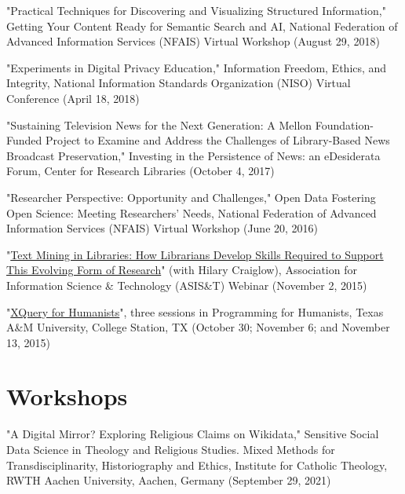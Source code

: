 \documentclass[]{res} %
\begin{document}
\begin{resume}
\begin{hangparas}{.25in}{1}"Practical Techniques for Discovering and Visualizing Structured Information," Getting Your Content Ready for Semantic Search and AI, National Federation of Advanced Information Services (NFAIS) Virtual Workshop (August 29, 2018)\end{hangparas}

\begin{hangparas}{.25in}{1}"Experiments in Digital Privacy Education," Information Freedom, Ethics, and Integrity, National Information Standards Organization (NISO) Virtual Conference (April 18, 2018)\end{hangparas}

\begin{hangparas}{.25in}{1}"Sustaining Television News for the Next Generation: A Mellon Foundation-Funded Project to Examine and Address the Challenges of Library-Based News Broadcast Preservation," Investing in the Persistence of News: an eDesiderata Forum, Center for Research Libraries (October 4, 2017)\end{hangparas}

\begin{hangparas}{.25in}{1}"Researcher Perspective: Opportunity and Challenges," Open Data Fostering Open Science: Meeting Researchers’ Needs, National Federation of Advanced Information Services (NFAIS) Virtual Workshop (June 20, 2016)\end{hangparas}

\begin{hangparas}{.25in}{1}"\href{https://www.asist.org/events/webinars/text-mining-in-libraries/}{Text Mining in Libraries: How Librarians Develop Skills Required to Support This Evolving Form of Research}" (with Hilary Craiglow), Association for Information Science \& Technology (ASIS\&T) Webinar (November 2, 2015)\end{hangparas}

\begin{hangparas}{.25in}{1}"\href{http://programming4humanists.tamu.edu/syllabus-fall-2015/}{XQuery for Humanists}", three sessions in Programming for Humanists, Texas A\&M University, College Station, TX (October 30; November 6; and November 13, 2015)\end{hangparas}

\section{Workshops}
\begin{hangparas}{.25in}{1}"A Digital Mirror? Exploring Religious Claims on Wikidata," Sensitive Social Data Science in Theology and Religious Studies. Mixed Methods for Transdisciplinarity, Historiography and Ethics, Institute for Catholic Theology, RWTH Aachen University, Aachen, Germany (September 29, 2021)\end{hangparas}


\end{resume}
\end{document}
